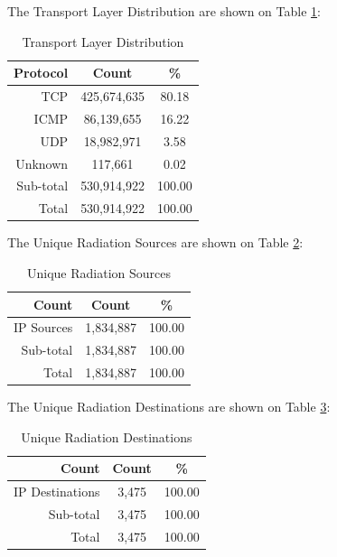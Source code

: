 \newpage
The Transport Layer Distribution are shown on Table \ref{tab:transportlayerdistribution}:
\begin{table}[!h]
\begin{center}
\caption{Transport Layer Distribution}
\label{tab:transportlayerdistribution}
\begin{tabular}{ |r|c|c| }
\hline
\centering Protocol & Count & \%  \\
\hline
TCP & 425,674,635 & 80.18  \\
ICMP & 86,139,655 & 16.22  \\
UDP & 18,982,971 & 3.58  \\
Unknown & 117,661 & 0.02  \\
\hline
Sub-total & 530,914,922 & 100.00  \\
\hline
Total & 530,914,922 & 100.00  \\
\hline
\end{tabular}
\end{center}
\end{table}

\newpage
The Unique Radiation Sources are shown on Table \ref{tab:uniqueradiationsources}:
\begin{table}[!h]
\begin{center}
\caption{Unique Radiation Sources}
\label{tab:uniqueradiationsources}
\begin{tabular}{ |r|c|c| }
\hline
\centering Count & Count & \%  \\
\hline
IP Sources & 1,834,887 & 100.00  \\
\hline
Sub-total & 1,834,887 & 100.00  \\
\hline
Total & 1,834,887 & 100.00  \\
\hline
\end{tabular}
\end{center}
\end{table}

\newpage
The Unique Radiation Destinations are shown on Table \ref{tab:uniqueradiationdestinations}:
\begin{table}[!h]
\begin{center}
\caption{Unique Radiation Destinations}
\label{tab:uniqueradiationdestinations}
\begin{tabular}{ |r|c|c| }
\hline
\centering Count & Count & \%  \\
\hline
IP Destinations & 3,475 & 100.00  \\
\hline
Sub-total & 3,475 & 100.00  \\
\hline
Total & 3,475 & 100.00  \\
\hline
\end{tabular}
\end{center}
\end{table}

